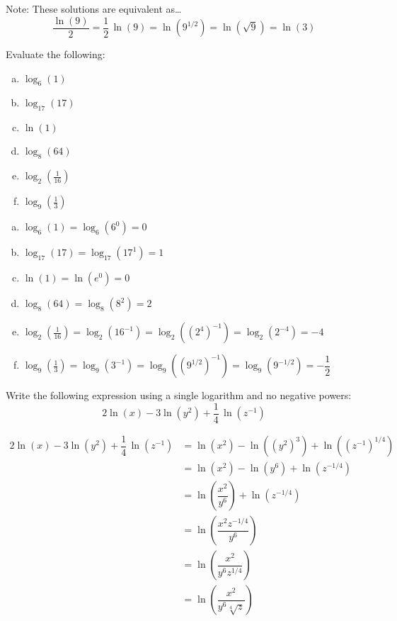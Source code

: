 \documentclass[12pt,letterpaper]{exam}
\begin{document}
\begin{questions}
{Note: These solutions are equivalent as\dots
	\[
	\dfrac{\ln(9)}{2}= \frac{1}{2}\, \ln(9)= \ln(9^{1/2})= \ln(\sqrt{9})= \ln(3)	
	\]
}



\newpage
\question[6] Evaluate the following:
	\begin{enumerate}[(a)]
	\item $\log_6(1)$
	\item $\log_{17}(17)$
	\item $\ln(1)$
	\item $\log_8(64)$
	\item $\log_2(\frac{1}{16})$
	\item $\log_9(\frac{1}{3})$
	\end{enumerate} \pspace

\begin{enumerate}[(a)]
\item $\log_6(1)= \log_6(6^0)= 0$ \pspace

\item $\log_{17}(17)= \log_{17}(17^1)= 1$ \pspace

\item $\ln(1)= \ln(e^0)= 0$ \pspace

\item $\log_8(64)= \log_8(8^2)= 2$ \pspace

\item $\log_2(\frac{1}{16})= \log_2(16^{-1})= \log_2\left( (2^4)^{-1} \right)= \log_2(2^{-4})= -4$ \pspace

\item $\log_9(\frac{1}{3})= \log_9(3^{-1})= \log_9\left( (9^{1/2})^{-1} \right)= \log_9(9^{-1/2})= -\dfrac{1}{2}$
\end{enumerate}



\newpage
\question[6] Write the following expression using a single logarithm and no negative powers:
	\[
	2 \ln(x) - 3 \ln(y^2) + \dfrac{1}{4}\,\ln(z^{-1})
	\] \pspace
	
	\[
	\begin{aligned}
	2 \ln(x) - 3 \ln(y^2) + \dfrac{1}{4}\,\ln(z^{-1})&= \ln(x^2) - \ln\left( (y^2)^3 \right) + \ln\left( (z^{-1})^{1/4} \right) \\[0.3cm]
	&= \ln(x^2) - \ln(y^6) + \ln(z^{-1/4}) \\[0.3cm]
	&= \ln\left( \dfrac{x^2}{y^6} \right) + \ln(z^{-1/4}) \\[0.3cm]
	&= \ln\left( \dfrac{x^2 z^{-1/4}}{y^6} \right) \\[0.3cm]
	&= \ln\left( \dfrac{x^2}{y^6 z^{1/4}} \right) \\[0.3cm]
	&= \ln\left( \dfrac{x^2}{y^6 \sqrt[4]{z}} \right) \\[0.3cm]
	\end{aligned}
	\]




\end{questions}
\end{document}
